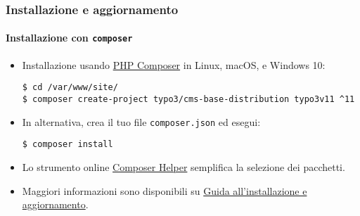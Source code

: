 %

\begin{frame}[fragile]
	\frametitle{Installazione e aggiornamento}
	\framesubtitle{Installazione con \texttt{composer}}


	\begin{itemize}
		\item Installazione usando \href{https://getcomposer.org}{PHP Composer} in Linux, macOS, e Windows 10:
\begin{lstlisting}
$ cd /var/www/site/
$ composer create-project typo3/cms-base-distribution typo3v11 ^11
\end{lstlisting}

		\item In alternativa, crea il tuo file \texttt{composer.json} ed esegui:
\begin{lstlisting}
$ composer install
\end{lstlisting}

		\item Lo strumento online \href{https://get.typo3.org/misc/composer/helper}{Composer Helper}
			semplifica la selezione dei pacchetti.

		\item Maggiori informazioni sono disponibili su
			\href{https://docs.typo3.org/m/typo3/guide-installation/master/en-us/}{Guida all'installazione e aggiornamento}.

	\end{itemize}
\end{frame}

